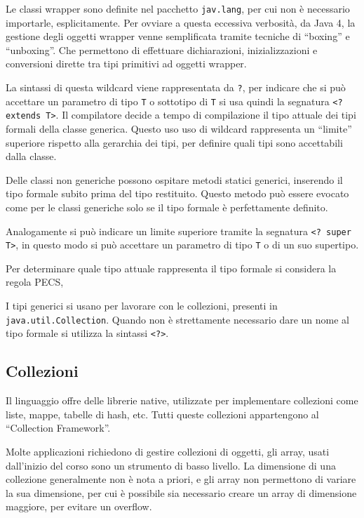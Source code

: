 \documentclass{article}
\numberwithin{equation}{subsection}
\begin{document}
Le classi wrapper sono definite nel pacchetto \verb|jav.lang|, per cui non è necessario importarle, esplicitamente. Per ovviare a questa eccessiva verbosità, da 
Java 4, la gestione degli oggetti wrapper venne semplificata tramite tecniche di ``boxing'' e ``unboxing''. Che permettono di effettuare dichiarazioni, inizializzazioni e 
conversioni dirette tra tipi primitivi ad oggetti wrapper. 




La sintassi di questa wildcard viene rappresentata da \verb|?|, per indicare che si può accettare un parametro di tipo \verb|T| o sottotipo di \verb|T| si usa quindi la 
segnatura \verb|<? extends T>|. 
Il compilatore decide a tempo di compilazione il tipo attuale dei tipi formali della classe generica. Questo uso uso di wildcard rappresenta un ``limite'' superiore 
rispetto alla gerarchia dei tipi, per definire quali tipi sono accettabili dalla classe. 

Delle classi non generiche possono ospitare metodi statici generici, inserendo il tipo formale subito prima del tipo restituito. Questo metodo può essere evocato 
come per le classi generiche solo se il tipo formale è perfettamente definito. 

Analogamente si può indicare un limite superiore tramite la segnatura \verb|<? super T>|, in questo modo si può accettare un parametro di tipo \verb|T| o di un suo 
supertipo. 

Per determinare quale tipo attuale rappresenta il tipo formale si considera la regola PECS, %

I tipi generici si usano per lavorare con le collezioni, presenti in \verb|java.util.Collection|. 
Quando non è strettamente necessario dare un nome al tipo formale si utilizza la sintassi \verb|<?>|. 


\subsection{Collezioni}

Il linguaggio offre delle librerie native, utilizzate per implementare collezioni come liste, mappe, tabelle di hash, etc. 
Tutti queste collezioni appartengono al ``Collection Framework''. 


Molte applicazioni richiedono di gestire collezioni di oggetti, gli array, usati dall'inizio del corso sono un strumento di basso livello. La dimensione di una collezione 
generalmente non è nota a priori, e gli array non permettono di variare la sua dimensione, per cui è possibile sia necessario creare un array di dimensione maggiore, per 
evitare un overflow. 
\end{document}
